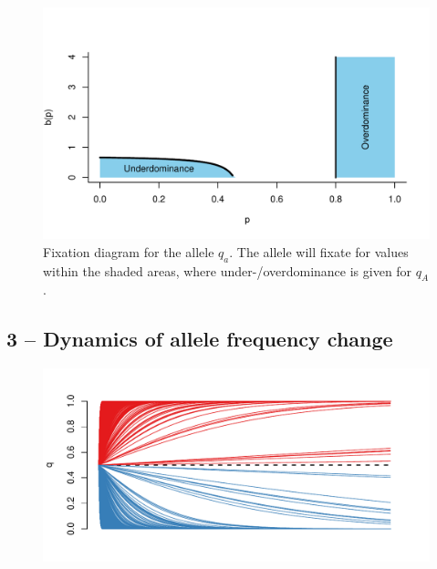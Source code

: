 \documentclass[10pt]{article}\usepackage[]{graphicx}\usepackage[]{color}
\makeatletter
\def\maxwidth{ %
  \ifdim\Gin@nat@width>\linewidth
    \linewidth
  \else
    \Gin@nat@width
  \fi
}
\theoremstyle{plain}
\makeatother
\begin{document}
\begin{multicols*}{2}
\begin{enumerate}
\end{enumerate}

\begin{Schunk}
\begin{figure}[H]

{\centering \includegraphics[width=\maxwidth]{figure/twocolumn-3_fixation-1} 

}

\caption[Fixation diagram for the allele $q_a$]{Fixation diagram for the allele $q_a$. The allele will fixate for values within the shaded areas, where under-/overdominance is given for $q_A$.}\label{fig:3_fixation}
\end{figure}
\end{Schunk}


\subsection*{3 -- Dynamics of allele frequency change}
\begin{Schunk}
\begin{figure}[H]

{\centering \includegraphics[width=\maxwidth]{figure/twocolumn-3_selection-1} 

}
\end{figure}
\end{Schunk}
\end{multicols*}
\end{document}
